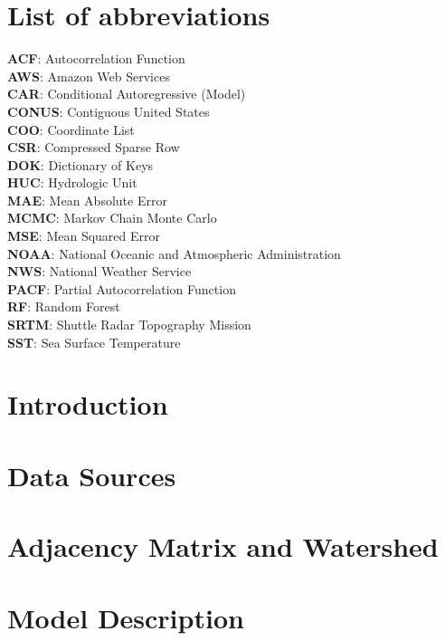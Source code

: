 \documentclass{svjour3}
\begin{document}
\section*{List of abbreviations}
\textbf{ACF}: Autocorrelation Function \\
\textbf{AWS}: Amazon Web Services \\
\textbf{CAR}: Conditional Autoregressive (Model) \\
\textbf{CONUS}: Contiguous United States \\
\textbf{COO}: Coordinate List \\
\textbf{CSR}: Compressed Sparse Row \\
\textbf{DOK}: Dictionary of Keys \\
\textbf{HUC}: Hydrologic Unit \\ 
\textbf{MAE}: Mean Absolute Error \\
\textbf{MCMC}: Markov Chain Monte Carlo \\ 
\textbf{MSE}: Mean Squared Error \\ 
\textbf{NOAA}: National Oceanic and Atmospheric Administration\\
\textbf{NWS}: National Weather Service \\ 
\textbf{PACF}: Partial Autocorrelation Function \\
\textbf{RF}: Random Forest \\ 
\textbf{SRTM}: Shuttle Radar Topography Mission \\
\textbf{SST}: Sea Surface Temperature  \\

\newpage
\section{Introduction}\label{sec:intro}


\section{Data Sources}\label{sec:source}


\section{Adjacency Matrix and Watershed}\label{sec:watershed}


\section{Model Description}\label{sec:model}

\end{document}
